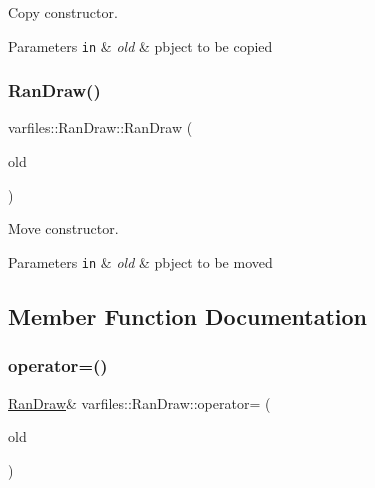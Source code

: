 Copy constructor. 


\begin{DoxyParams}[1]{Parameters}
\mbox{\tt in}  & {\em old} & pbject to be copied \\
\hline
\end{DoxyParams}
\mbox{\label{classvarfiles_1_1_ran_draw_a1e4bf61c54ea31ff650707939a0d8fa3}} 
\subsubsection{\texorpdfstring{Ran\+Draw()}{RanDraw()}\hspace{0.1cm}{\footnotesize\ttfamily [3/3]}}
{\footnotesize\ttfamily varfiles\+::\+Ran\+Draw\+::\+Ran\+Draw (\begin{DoxyParamCaption}\item[{\hyperlink{classvarfiles_1_1_ran_draw}{Ran\+Draw} \&\&}]{old }\end{DoxyParamCaption})\hspace{0.3cm}{\ttfamily [default]}}



Move constructor. 


\begin{DoxyParams}[1]{Parameters}
\mbox{\tt in}  & {\em old} & pbject to be moved \\
\hline
\end{DoxyParams}


\subsection{Member Function Documentation}
\mbox{\label{classvarfiles_1_1_ran_draw_ac4576939ba8d09ad19b57ceb148864fa}} 
\subsubsection{\texorpdfstring{operator=()}{operator=()}\hspace{0.1cm}{\footnotesize\ttfamily [1/2]}}
{\footnotesize\ttfamily \hyperlink{classvarfiles_1_1_ran_draw}{Ran\+Draw}\& varfiles\+::\+Ran\+Draw\+::operator= (\begin{DoxyParamCaption}\item[{const \hyperlink{classvarfiles_1_1_ran_draw}{Ran\+Draw} \&}]{old }\end{DoxyParamCaption})\hspace{0.3cm}{\ttfamily [default]}}



